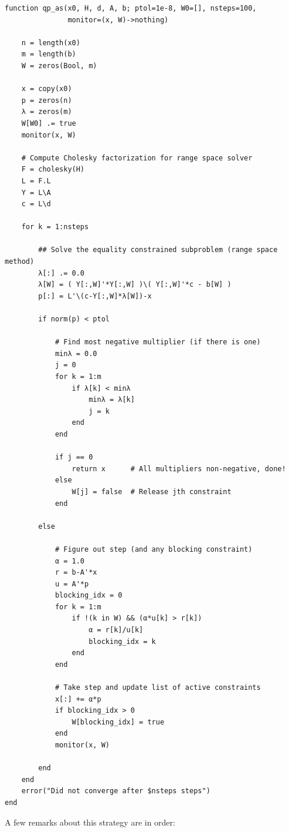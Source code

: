 \documentclass[12pt, leqno]{article} %
\begin{document}
\begin{verbatim}
function qp_as(x0, H, d, A, b; ptol=1e-8, W0=[], nsteps=100,
               monitor=(x, W)->nothing)

    n = length(x0)
    m = length(b)
    W = zeros(Bool, m)

    x = copy(x0)
    p = zeros(n)
    λ = zeros(m)
    W[W0] .= true
    monitor(x, W)

    # Compute Cholesky factorization for range space solver
    F = cholesky(H)
    L = F.L
    Y = L\A
    c = L\d

    for k = 1:nsteps

        ## Solve the equality constrained subproblem (range space method)
        λ[:] .= 0.0
        λ[W] = ( Y[:,W]'*Y[:,W] )\( Y[:,W]'*c - b[W] )
        p[:] = L'\(c-Y[:,W]*λ[W])-x

        if norm(p) < ptol

            # Find most negative multiplier (if there is one)
            minλ = 0.0
            j = 0
            for k = 1:m
                if λ[k] < minλ
                    minλ = λ[k]
                    j = k
                end
            end

            if j == 0
                return x      # All multipliers non-negative, done!
            else
                W[j] = false  # Release jth constraint
            end

        else

            # Figure out step (and any blocking constraint)
            α = 1.0
            r = b-A'*x
            u = A'*p
            blocking_idx = 0
            for k = 1:m
                if !(k in W) && (α*u[k] > r[k])
                    α = r[k]/u[k]
                    blocking_idx = k
                end
            end

            # Take step and update list of active constraints
            x[:] += α*p
            if blocking_idx > 0
                W[blocking_idx] = true
            end
            monitor(x, W)

        end
    end
    error("Did not converge after $nsteps steps")
end
\end{verbatim}

A few remarks about this strategy are in order:
\end{document}

